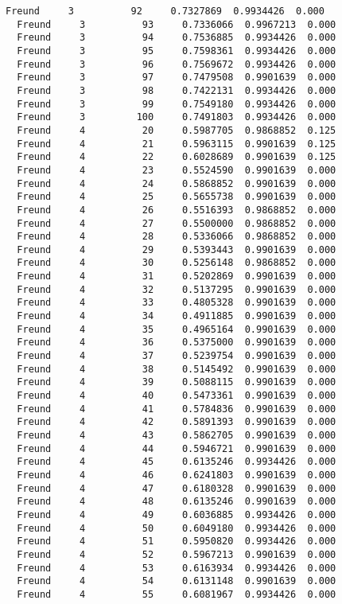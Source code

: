 \documentclass[11pt]{article}
\begin{document}
\begin{Verbatim}[commandchars=\\\{\}]
  Freund     3          92     0.7327869  0.9934426  0.000
  Freund     3          93     0.7336066  0.9967213  0.000
  Freund     3          94     0.7536885  0.9934426  0.000
  Freund     3          95     0.7598361  0.9934426  0.000
  Freund     3          96     0.7569672  0.9934426  0.000
  Freund     3          97     0.7479508  0.9901639  0.000
  Freund     3          98     0.7422131  0.9934426  0.000
  Freund     3          99     0.7549180  0.9934426  0.000
  Freund     3         100     0.7491803  0.9934426  0.000
  Freund     4          20     0.5987705  0.9868852  0.125
  Freund     4          21     0.5963115  0.9901639  0.125
  Freund     4          22     0.6028689  0.9901639  0.125
  Freund     4          23     0.5524590  0.9901639  0.000
  Freund     4          24     0.5868852  0.9901639  0.000
  Freund     4          25     0.5655738  0.9901639  0.000
  Freund     4          26     0.5516393  0.9868852  0.000
  Freund     4          27     0.5500000  0.9868852  0.000
  Freund     4          28     0.5336066  0.9868852  0.000
  Freund     4          29     0.5393443  0.9901639  0.000
  Freund     4          30     0.5256148  0.9868852  0.000
  Freund     4          31     0.5202869  0.9901639  0.000
  Freund     4          32     0.5137295  0.9901639  0.000
  Freund     4          33     0.4805328  0.9901639  0.000
  Freund     4          34     0.4911885  0.9901639  0.000
  Freund     4          35     0.4965164  0.9901639  0.000
  Freund     4          36     0.5375000  0.9901639  0.000
  Freund     4          37     0.5239754  0.9901639  0.000
  Freund     4          38     0.5145492  0.9901639  0.000
  Freund     4          39     0.5088115  0.9901639  0.000
  Freund     4          40     0.5473361  0.9901639  0.000
  Freund     4          41     0.5784836  0.9901639  0.000
  Freund     4          42     0.5891393  0.9901639  0.000
  Freund     4          43     0.5862705  0.9901639  0.000
  Freund     4          44     0.5946721  0.9901639  0.000
  Freund     4          45     0.6135246  0.9934426  0.000
  Freund     4          46     0.6241803  0.9901639  0.000
  Freund     4          47     0.6180328  0.9901639  0.000
  Freund     4          48     0.6135246  0.9901639  0.000
  Freund     4          49     0.6036885  0.9934426  0.000
  Freund     4          50     0.6049180  0.9934426  0.000
  Freund     4          51     0.5950820  0.9934426  0.000
  Freund     4          52     0.5967213  0.9901639  0.000
  Freund     4          53     0.6163934  0.9934426  0.000
  Freund     4          54     0.6131148  0.9901639  0.000
  Freund     4          55     0.6081967  0.9934426  0.000

\end{Verbatim}
\end{document}
